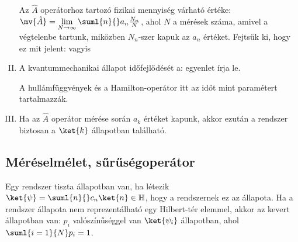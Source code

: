 \begin{enumerate}[I.]
    Az $\hat{A}$ operátorhoz tartozó fizikai mennyiség várható értéke: $\mv{\hat{A}}=\lim\limits_{N\to\infty}{\suml{n}{}a_n\frac{N_n}{N}}$, ahol $N$ a mérések száma, amivel a végtelenbe tartunk, miközben $N_n$-szer kapuk az $a_n$ értéket.
   Fejtsük ki, hogy ez mit jelent:
    vagyis 
    \item A kvantummechanikai állapot időfejlődését a:
    egyenlet írja le.

    A hullámfüggvények és a Hamilton-operátor itt az időt mint paramétert tartalmazzák. 
    \item Ha az $\hat{A}$ operátor mérése során $a_k$ értéket kapunk, akkor ezután a rendszer biztosan a $\ket{k}$ állapotban található.
   \end{enumerate}
   
  \subsection{Méréselmélet, sűrűségoperátor}\label{ss:01-mereselmelet}
   
   Egy rendszer tiszta állapotban van, ha létezik $\ket{\psi}=\suml{n}{}c_n\ket{n}\in\mathbb{H}$, hogy a rendszernek ez az állapota.
   Ha a rendszer állapota nem reprezentálható egy Hilbert-tér elemmel, akkor az kevert állapotban van: $p_i$ valószínűséggel van $\ket{\psi_i}$ állapotban, ahol $\suml{i=1}{N}p_i=1$. 
   
